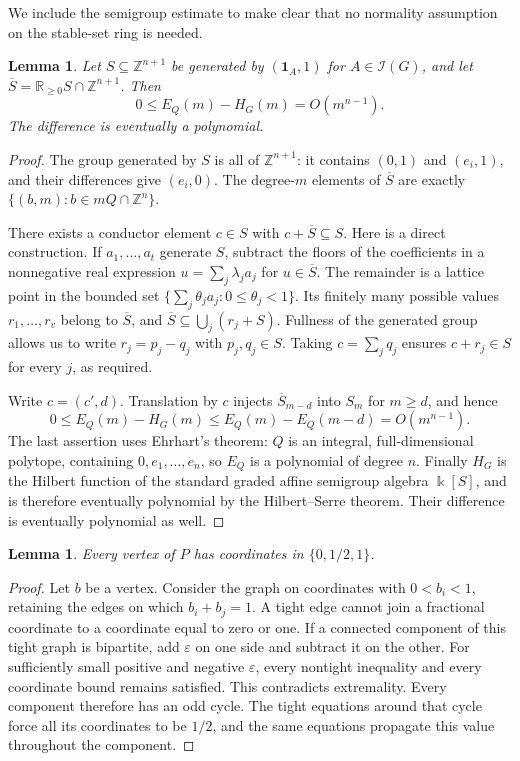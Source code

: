 \documentclass[11pt]{article}
\newtheorem{lemma}[theorem]{Lemma}
\theoremstyle{remark}
\newcommand{\ZZ}{\mathbb Z}
\newcommand{\RR}{\mathbb R}
\newcommand{\kk}{\Bbbk}
\newcommand{\one}{\mathbf 1}
\begin{document}
We include the semigroup estimate to make clear that no normality
assumption on the stable-set ring is needed.

\begin{lemma}\label{lem:conductor}
Let $S\subseteq\ZZ^{n+1}$ be generated by $(\one_A,1)$ for
$A\in\mathcal I(G)$, and let
$\overline S=\RR_{\geq0}S\cap\ZZ^{n+1}$. Then
\[
0\leq E_Q(m)-H_G(m)=O(m^{n-1}).
\]
The difference is eventually a polynomial.
\end{lemma}
\begin{proof}
The group generated by $S$ is all of $\ZZ^{n+1}$: it contains
$(0,1)$ and $(e_i,1)$, and their differences give $(e_i,0)$.
The degree-$m$ elements of $\overline S$ are exactly
$\{(b,m):b\in mQ\cap\ZZ^n\}$.

There exists a conductor element $c\in S$ with $c+\overline S\subseteq S$.
Here is a direct construction. If $a_1,\ldots,a_t$ generate $S$, subtract
the floors of the coefficients in a nonnegative real expression
$u=\sum_j\lambda_ja_j$ for $u\in\overline S$. The remainder is a lattice
point in the bounded set $\{\sum_j\theta_ja_j:0\leq\theta_j<1\}$.
Its finitely many possible values $r_1,\ldots,r_v$ belong to
$\overline S$, and $\overline S\subseteq\bigcup_j(r_j+S)$.
Fullness of the generated group allows us to write
$r_j=p_j-q_j$ with $p_j,q_j\in S$. Taking $c=\sum_jq_j$ ensures
$c+r_j\in S$ for every $j$, as required.

Write $c=(c',d)$. Translation by $c$ injects
$\overline S_{m-d}$ into $S_m$ for $m\geq d$, and hence
\[
0\leq E_Q(m)-H_G(m)\leq E_Q(m)-E_Q(m-d)=O(m^{n-1}).
\]
The last assertion uses Ehrhart's theorem: $Q$ is an integral,
full-dimensional polytope, containing $0,e_1,\ldots,e_n$, so $E_Q$ is
a polynomial of degree $n$. Finally $H_G$ is the Hilbert function of the
standard graded affine semigroup algebra $\kk[S]$, and is therefore
eventually polynomial by the Hilbert--Serre theorem. Their difference is
eventually polynomial as well.
\end{proof}

\begin{lemma}\label{lem:half}
Every vertex of $P$ has coordinates in $\{0,1/2,1\}$.
\end{lemma}
\begin{proof}
Let $b$ be a vertex. Consider the graph on coordinates with
$0<b_i<1$, retaining the edges on which $b_i+b_j=1$. A tight edge cannot
join a fractional coordinate to a coordinate equal to zero or one.
If a connected component of this tight graph is bipartite, add
$\varepsilon$ on one side and subtract it on the other. For sufficiently
small positive and negative $\varepsilon$, every nontight inequality and
every coordinate bound remains satisfied. This contradicts extremality.
Every component therefore has an odd cycle. The tight equations around
that cycle force all its coordinates to be $1/2$, and the same equations
propagate this value throughout the component.
\end{proof}
\end{document}
